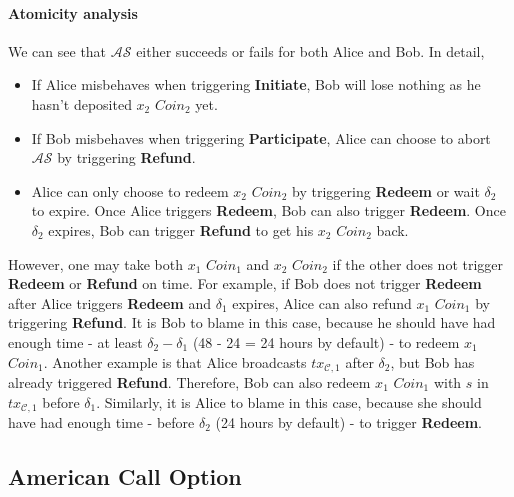 \paragraph{Atomicity analysis}
We can see that $\mathcal{AS}$ either succeeds or fails for both Alice and Bob.
In detail,

\begin{itemize}
    \item If Alice misbehaves when triggering \textbf{Initiate}, Bob will lose nothing as he hasn't deposited $x_2$ $Coin_2$ yet.
    \item If Bob misbehaves when triggering \textbf{Participate}, Alice can choose to abort $\mathcal{AS}$ by triggering \textbf{Refund}.
    \item Alice can only choose to redeem $x_2$ $Coin_2$ by triggering \textbf{Redeem} or wait $\delta_2$ to expire.
    Once Alice triggers \textbf{Redeem}, Bob can also trigger \textbf{Redeem}.
    Once $\delta_2$ expires, Bob can trigger \textbf{Refund} to get his $x_2$ $Coin_2$ back.
\end{itemize}

However, one may take both $x_1$ $Coin_1$ and $x_2$ $Coin_2$ if the other does not trigger \textbf{Redeem} or \textbf{Refund} on time.
For example, if Bob does not trigger \textbf{Redeem} after Alice triggers \textbf{Redeem} and $\delta_1$ expires, Alice can also refund $x_1$ $Coin_1$ by triggering \textbf{Refund}.
It is Bob to blame in this case, because he should have had enough time - at least $\delta_2 - \delta_1$ (48 - 24 = 24 hours by default) - to redeem $x_1$ $Coin_1$.
Another example is that Alice broadcasts $tx_{\mathcal{C}, 1}$ after $\delta_2$, but Bob has already triggered \textbf{Refund}.
Therefore, Bob can also redeem $x_1$ $Coin_1$ with $s$ in $tx_{\mathcal{C}, 1}$ before $\delta_1$.
Similarly, it is Alice to blame in this case, because she should have had enough time - before $\delta_2$ (24 hours by default) - to trigger \textbf{Redeem}.















\subsection{American Call Option}

